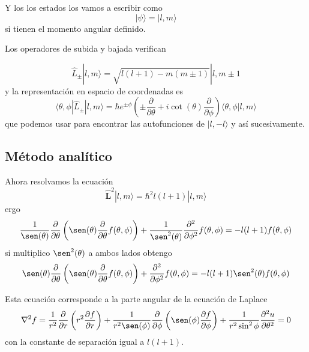 \documentclass{book}
\numberwithin{equation}{section} %
\begin{document}
Y los los estados los vamos a escribir como
\begin{equation}
    |\psi\rangle = |l, m\rangle
\end{equation}
si tienen el momento angular definido.

Los operadores de subida y bajada verifican

\begin{equation}
    \hat{L}_\pm |l, m\rangle = \sqrt{l(l + 1) - m( m \pm 1)} |l, m \pm 1
\end{equation}
y la representación en espacio de coordenadas es
\begin{equation}
    \langle \theta, \phi | \hat{L}_\pm |l, m\rangle = \hbar e^{\pm \phi} \left(\pm \frac{\partial}{\partial \theta} + i \cot(\theta) \frac{\partial}{\partial \phi} \right) \langle \theta, \phi | l, m\rangle
\end{equation}
que podemos usar para encontrar las autofunciones de $|l,-l\rangle$ y así sucesivamente.

\subsection{Método analítico}

Ahora resolvamos la ecuación 
\begin{equation}
    \hat{\boldsymbol{L}}^2 |l,m\rangle = \hbar^2 l(l + 1) |l, m\rangle
\end{equation}
ergo
\begin{equation}
    \frac{1}{\sen(\theta)} \frac{\partial}{\partial \theta} \left(\sen(\theta) \frac{\partial}{\partial \theta} f(\theta, \phi) \right) + \frac{1}{\sen^2(\theta)} \frac{\partial^2}{\partial \phi^2} f(\theta, \phi) = - l (l + 1) f(\theta, \phi)
\end{equation}
si multiplico $\sen^2(\theta)$ a ambos lados obtengo
\begin{equation}
    \sen(\theta) \frac{\partial}{\partial \theta} \left(\sen(\theta) \frac{\partial}{\partial \theta} f(\theta, \phi) \right) +  \frac{\partial^2}{\partial \phi^2} f(\theta, \phi) =  -  l (l + 1) \sen^2(\theta) f(\theta, \phi)
    \label{eq:momento_angular_laplace}
\end{equation}

Esta ecuación corresponde a la parte angular de la ecuación de Laplace
\begin{equation}
    \nabla^2 f = \frac{1}{r^2} \frac{\partial}{\partial r}\left( r^2 \frac{\partial f}{\partial r} \right) + \frac{1}{r^2 \sen(\phi)} \frac{\partial}{\partial \phi} \left( \sen(\phi) \frac{\partial f}{ \partial \phi} \right) + \frac{1}{r^2 \sin^2 \phi} \frac{\partial^2 u}{\partial \theta^2} = 0
\end{equation}
con la constante de separación igual a $l(l + 1)$.
\end{document}
